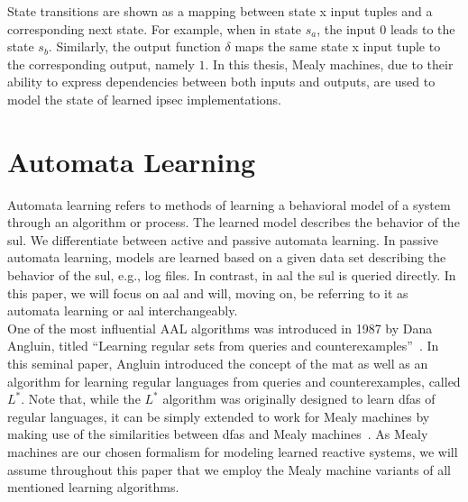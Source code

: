 State transitions are shown as a mapping between state x input tuples and a corresponding next state. For example, when in state $s_a$, the input $0$ leads to the state $s_b$. Similarly, the output function $\delta$ maps the same state x input tuple to the corresponding output, namely $1$. In this thesis, Mealy machines, due to their ability to express dependencies between both inputs and outputs, are used to model the state of learned \ac{ipsec} implementations.

\section{Automata Learning}
Automata learning refers to methods of learning a behavioral model of a system through an algorithm or process. The learned model describes the behavior of the \ac{sul}. We differentiate between active and passive automata learning. In passive automata learning, models are learned based on a given data set describing the behavior of the \ac{sul}, e.g., log files. In contrast, in \acf{aal} the \ac{sul} is queried directly. In this paper, we will focus on \ac{aal} and will, moving on, be referring to it as automata learning or \ac{aal} interchangeably. \\

One of the most influential AAL algorithms was introduced in 1987 by Dana Angluin, titled ``Learning regular sets from queries and counterexamples''~\cite{angluin1987learning}. In this seminal paper, Angluin introduced the concept of the \ac{mat} as well as an algorithm for learning regular languages from queries and counterexamples, called $L^*$. Note that, while the $L^*$ algorithm was originally designed to learn \acp{dfa} of regular languages, it can be simply extended to work for Mealy machines by making use of the similarities between \acp{dfa} and Mealy machines~\cite{hungar2003domain, shahbaz2009inferring}. As Mealy machines are our chosen formalism for modeling learned reactive systems, we will assume throughout this paper that we employ the Mealy machine variants of all mentioned learning algorithms. 

